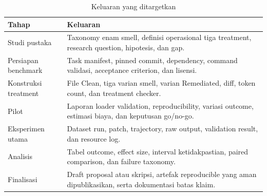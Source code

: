 \begin{table}[htbp]
\centering
\small
\renewcommand{\arraystretch}{1.25}
\caption{Keluaran yang ditargetkan}
\label{tab:deliverables}
\begin{tabularx}{\textwidth}{p{4.0cm}Y}
\toprule
\textbf{Tahap} & \textbf{Keluaran} \\
\midrule
Studi pustaka & Taxonomy enam smell, definisi operasional tiga treatment, research question, hipotesis, dan gap. \\
Persiapan benchmark & Task manifest, pinned commit, dependency, command validasi, acceptance criterion, dan lisensi. \\
Konstruksi treatment & File Clean, tiga varian smell, varian Remediated, diff, token count, dan treatment checker. \\
Pilot & Laporan loader validation, reproducibility, variasi outcome, estimasi biaya, dan keputusan go/no-go. \\
Eksperimen utama & Dataset run, patch, trajectory, raw output, validation result, dan resource log. \\
Analisis & Tabel outcome, effect size, interval ketidakpastian, paired comparison, dan failure taxonomy. \\
Finalisasi & Draft proposal atau skripsi, artefak reproducible yang aman dipublikasikan, serta dokumentasi batas klaim. \\
\bottomrule
\end{tabularx}
\end{table}
